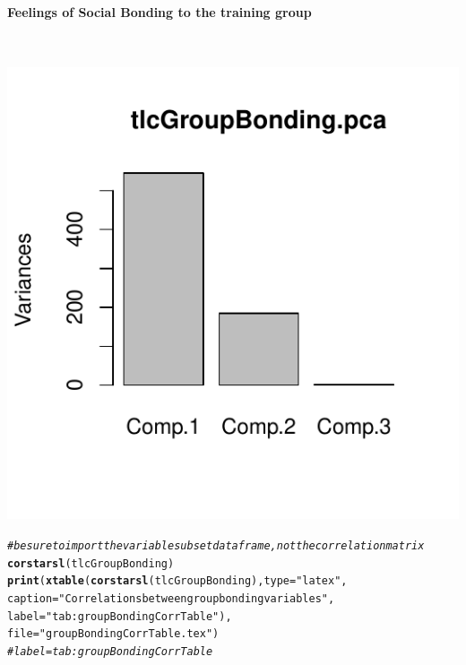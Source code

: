 \documentclass[english]{article}\usepackage[]{graphicx}\usepackage[]{color}
\makeatletter
\def\maxwidth{ %
  \ifdim\Gin@nat@width>\linewidth
    \linewidth
  \else
    \Gin@nat@width
  \fi
}
\newcommand{\hlstr}[1]{\textcolor[rgb]{0.192,0.494,0.8}{#1}}%
\newcommand{\hlcom}[1]{\textcolor[rgb]{0.678,0.584,0.686}{\textit{#1}}}%
\newcommand{\hlstd}[1]{\textcolor[rgb]{0.345,0.345,0.345}{#1}}%
\newcommand{\hlkwc}[1]{\textcolor[rgb]{0.333,0.667,0.333}{#1}}%
\newcommand{\hlkwd}[1]{\textcolor[rgb]{0.737,0.353,0.396}{\textbf{#1}}}%
\newenvironment{kframe}{%
 \def\at@end@of@kframe{}%
 \ifinner\ifhmode%
  \def\at@end@of@kframe{\end{minipage}}%
  \begin{minipage}{\columnwidth}%
 \fi\fi%
 \def\FrameCommand##1{\hskip\@totalleftmargin \hskip-\fboxsep
 \colorbox{shadecolor}{##1}\hskip-\fboxsep
     \hskip-\linewidth \hskip-\@totalleftmargin \hskip\columnwidth}%
 \MakeFramed {\advance\hsize-\width
   \@totalleftmargin\z@ \linewidth\hsize
   \@setminipage}}%
 {\par\unskip\endMakeFramed%
 \at@end@of@kframe}
\newenvironment{knitrout}{}{} %
\newcommand{\myparagraph}[1]{\paragraph{#1}\mbox{}\\}
\makeatother
\begin{document}
\myparagraph{Feelings of Social Bonding to the training group}
\begin{knitrout}
\color{fgcolor}

{\centering \includegraphics[width=\maxwidth]{figure/dataReductionGroupBonding-1} 

}



\end{knitrout}



\begin{knitrout}
\color{fgcolor}\begin{kframe}
\begin{alltt}
\hlcom{# be sure to import the variable subset data frame, not the correlation matrix}
\hlkwd{corstarsl}\hlstd{(tlcGroupBonding)}
\hlkwd{print}\hlstd{(}\hlkwd{xtable}\hlstd{(}\hlkwd{corstarsl}\hlstd{(tlcGroupBonding),} \hlkwc{type}\hlstd{=}\hlstr{"latex"}\hlstd{,}
                    \hlkwc{caption} \hlstd{=} \hlstr{"Correlations between group bonding variables"}\hlstd{,}
                    \hlkwc{label} \hlstd{=} \hlstr{"tab:groupBondingCorrTable"}\hlstd{),}
                    \hlkwc{file} \hlstd{=} \hlstr{"groupBondingCorrTable.tex"}\hlstd{)}
\hlcom{# label = tab:groupBondingCorrTable}
\end{alltt}
\end{kframe}
\end{knitrout}
\end{document}
